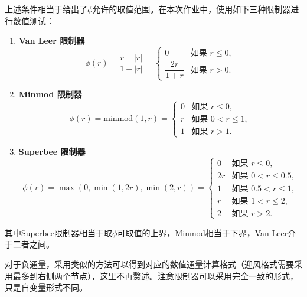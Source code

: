 \documentclass[12pt, a4paper]{article}
\begin{document}
上述条件相当于给出了$\phi$允许的取值范围。在本次作业中，使用如下三种限制器进行数值测试：
\begin{enumerate}
    \item \textbf{Van Leer 限制器} 
    \begin{equation*}
        \phi(r) = \frac{r + |r|}{1 + |r|} = 
        \begin{cases}
            0 & \text{如果 } r \leq 0, \\
            \dfrac{2r}{1 + r} & \text{如果 } r > 0.
        \end{cases}
    \end{equation*}

    \item \textbf{Minmod 限制器}
    \begin{equation*}
        \phi(r) = \text{minmod}(1, r) = 
        \begin{cases}
            0 & \text{如果 } r \leq 0, \\
            r & \text{如果 } 0 < r \leq 1, \\
            1 & \text{如果 } r > 1.
        \end{cases}
    \end{equation*}

    \item \textbf{Superbee 限制器}
    \begin{equation*}
        \phi(r) = \max\left(0, \min(1, 2r), \min(2, r)\right) = 
        \begin{cases}
            0 & \text{如果 } r \leq 0, \\
            2r & \text{如果 } 0 < r \leq 0.5, \\
            1 & \text{如果 } 0.5 < r \leq 1, \\
            r & \text{如果 } 1 < r \leq 2, \\
            2 & \text{如果 } r > 2.
        \end{cases}
    \end{equation*}
\end{enumerate}

其中Superbee限制器相当于取$\phi$可取值的上界，Minmod相当于下界，Van Leer介于二者之间。

对于负通量，采用类似的方法可以得到对应的数值通量计算格式（迎风格式需要采用最多到右侧两个节点），这里不再赘述。注意限制器可以采用完全一致的形式，
只是自变量形式不同。
\end{document}
